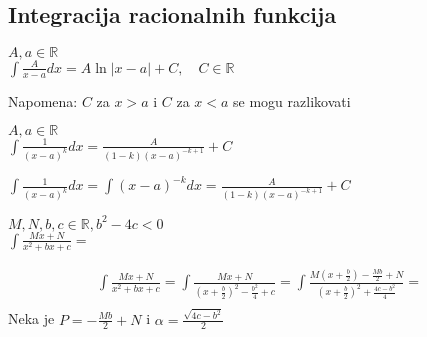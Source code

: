 \documentclass{article}
\begin{document}
\subsection{Integracija racionalnih funkcija}
\begin{primbox}
    $A, a \in \mathbb{R}$\\
    $\int \frac{A}{x-a}dx = A\ln|x-a| + C, \quad C \in \mathbb{R}$
\end{primbox}

Napomena: $C$ za $x > a$ i $C$ za $x < a$ se mogu razlikovati
\begin{primbox}
    $A, a \in \mathbb{R}$\\
    $\int\frac{1}{(x-a)^k}dx = \frac{A}{(1-k)(x-a)^{-k+1}} + C$
\end{primbox}
$\int\frac{1}{(x-a)^k}dx = \int(x-a)^{-k}dx =\frac{A}{(1-k)(x-a)^{-k+1}} + C$
\begin{primbox}
    $M, N, b, c \in \mathbb{R}, b^2 - 4c < 0$\\
    $\int \frac{Mx+N}{x^2+bx + c} = $
\end{primbox}
\begin{align*}
    \int \frac{Mx+N}{x^2+bx + c}
    = \int \frac{Mx + N}{(x + \frac{b}{2})^2-\frac{b^2}{4}+c}
    =\int\frac{M(x+\frac{b}{2})-\frac{Mb}{2} + N}{(x+\frac{b}{2})^2 + \frac{4c-b^2}{4}} = \\
\end{align*}
Neka je $P = -\frac{Mb}{2} + N$ i $\alpha = \frac{\sqrt{4c-b^2}}{2}$
\end{document}
